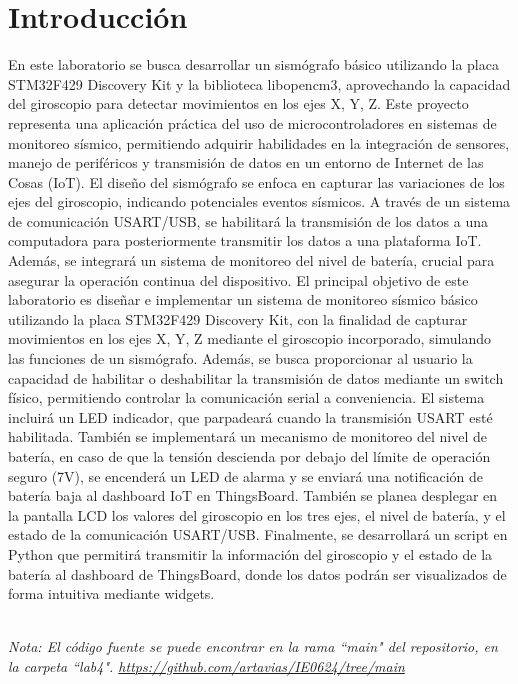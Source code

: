 \section{Introducción}
En este laboratorio se busca desarrollar un sismógrafo básico utilizando la placa STM32F429 Discovery Kit y la biblioteca libopencm3, aprovechando la capacidad del giroscopio para detectar movimientos en los ejes X, Y, Z. Este proyecto representa una aplicación práctica del uso de microcontroladores en sistemas de monitoreo sísmico, permitiendo adquirir habilidades en la integración de sensores, manejo de periféricos y transmisión de datos en un entorno de Internet de las Cosas (IoT).
El diseño del sismógrafo se enfoca en capturar las variaciones de los ejes del giroscopio, indicando potenciales eventos sísmicos. A través de un sistema de comunicación USART/USB, se habilitará la transmisión de los datos a una computadora para posteriormente transmitir los datos a una plataforma IoT. Además, se integrará un sistema de monitoreo del nivel de batería, crucial para asegurar la operación continua del dispositivo.
El principal objetivo de este laboratorio es diseñar e implementar un sistema de monitoreo sísmico básico utilizando la placa STM32F429 Discovery Kit, con la finalidad de capturar movimientos en los ejes X, Y, Z mediante el giroscopio incorporado, simulando las funciones de un sismógrafo. Además, se busca proporcionar al usuario la capacidad de habilitar o deshabilitar la transmisión de datos mediante un switch físico, permitiendo controlar la comunicación serial a conveniencia.
El sistema incluirá un LED indicador, que parpadeará cuando la transmisión USART esté habilitada. También se implementará un mecanismo de monitoreo del nivel de batería, en caso de que la tensión descienda por debajo del límite de operación seguro (7V), se encenderá un LED de alarma y se enviará una notificación de batería baja al dashboard IoT en ThingsBoard.
También se planea desplegar en la pantalla LCD los valores del giroscopio en los tres ejes, el nivel de batería, y el estado de la comunicación USART/USB. Finalmente, se desarrollará un script en Python que permitirá transmitir la información del giroscopio y el estado de la batería al dashboard de ThingsBoard, donde los datos podrán ser visualizados de forma intuitiva mediante widgets. 

\vspace{1cm}\\
\textit{Nota: El código fuente se puede encontrar en la rama  ``main" del repositorio, en la carpeta ``lab4". \url{https://github.com/artavias/IE0624/tree/main}}
